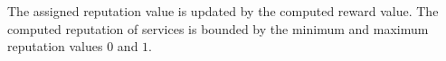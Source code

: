 The assigned reputation value is updated by the computed reward
value. The computed reputation of services is bounded by the
minimum and maximum reputation values $0$ and $1$. %
%
%
%



